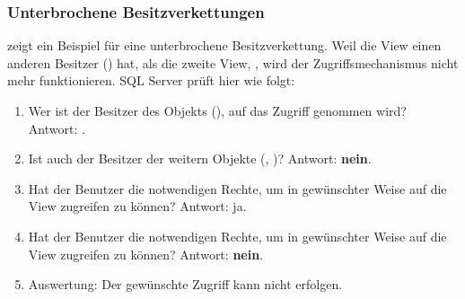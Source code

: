         \subsubsection{Unterbrochene Besitzverkettungen}
           zeigt ein Beispiel für eine
          unterbrochene Besitzverkettung. Weil
          die View  einen anderen
          Besitzer () hat, als die zweite View, 
          , wird der
          Zugriffsmechanismus nicht mehr funktionieren. SQL Server prüft hier
          wie folgt:
          \begin{enumerate}
            \item Wer ist der Besitzer des Objekts
            (), auf das Zugriff
            genommen wird? Antwort: .
            \item Ist  auch der Besitzer der weitern Objekte
            (, )?
            Antwort: \textbf{nein}.
            \item Hat der Benutzer  die notwendigen Rechte, um
            in gewünschter Weise auf die View
             zugreifen zu können?
            Antwort: ja.
            \item Hat der Benutzer  die notwendigen Rechte, um
            in gewünschter Weise auf die
            View  zugreifen zu können?
            Antwort:
            \textbf{nein}.
            \item Auswertung: Der gewünschte Zugriff kann nicht erfolgen.
          \end{enumerate}
          \begin{literaturinternet}
            \item \cite{ms188676}
            \item \cite{bb669084}
          \end{literaturinternet}

